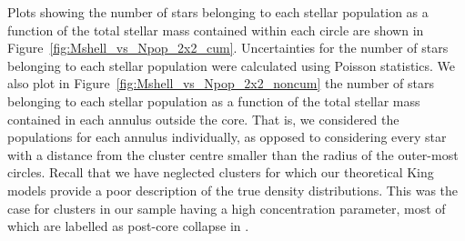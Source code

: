 Plots showing the number of stars belonging to each stellar population
as a function of the total stellar mass contained within each circle
are shown in Figure~\ref{fig:Mshell_vs_Npop_2x2_cum}.  Uncertainties
for the number of stars belonging to each stellar population were
calculated using Poisson statistics.  We also plot 
in Figure~\ref{fig:Mshell_vs_Npop_2x2_noncum} the number of stars
belonging to each stellar population as a 
function of the total stellar mass contained in each annulus outside
the core.  That is, we
considered the populations for each annulus individually, as opposed
to considering every star with a 
distance from the cluster centre smaller than the radius of the
outer-most circles.  Recall that we have neglected 
clusters for which
our theoretical King models provide a poor description of the true
density distributions.  This was the case for clusters
in our sample having a high concentration parameter, most of
which are labelled as post-core collapse in \citet{harris96}.

